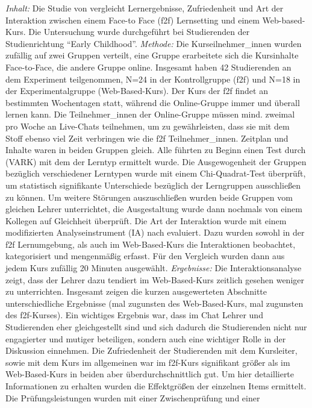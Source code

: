 \emph{Inhalt:} Die Studie von \textcite{mentzer2007two} vergleicht
Lernergebnisse, Zufriedenheit und Art der Interaktion zwischen einem
Face-to Face (f2f) Lernsetting und einem Web-based-Kurs. Die
Untersuchung wurde durchgeführt bei Studierenden der Studienrichtung
``Early Childhood''. \emph{Methode:} Die Kurseilnehmer\_innen wurden
zufällig auf zwei Gruppen verteilt, eine Gruppe erarbeitete sich die
Kursinhalte Face-to-Face, die andere Gruppe online. Insgesamt haben 42
Studierenden an dem Experiment teilgenommen, N=24 in der Kontrollgruppe
(f2f) und N=18 in der Experimentalgruppe (Web-Based-Kurs). Der Kurs der
f2f findet an bestimmten Wochentagen statt, während die Online-Gruppe
immer und überall lernen kann. Die Teilnehmer\_innen der Online-Gruppe
müssen mind. zweimal pro Woche an Live-Chats teilnehmen, um zu
gewährleisten, dass sie mit dem Stoff ebenso viel Zeit verbringen wie
die f2f Teilnehmer\_innen. Zeitplan und Inhalte waren in beiden Gruppen
gleich. Alle führten zu Beginn einen Test durch (VARK) mit dem der
Lerntyp ermittelt wurde. Die Ausgewogenheit der Gruppen bezüglich
verschiedener Lerntypen wurde mit einem Chi-Quadrat-Test überprüft, um
statistisch signifikante Unterschiede bezüglich der Lerngruppen
ausschließen zu können. Um weitere Störungen auszuschließen wurden beide
Gruppen vom gleichen Lehrer unterrichtet, die Ausgestaltung wurde dann
nochmals von einem Kollegen auf Gleichheit überprüft. Die Art der
Interaktion wurde mit einem modifizierten Analyseinstrument (IA) nach
\textcite{Flanders1961} evaluiert. Dazu wurden sowohl in der f2f
Lernumgebung, als auch im Web-Based-Kurs die Interaktionen beobachtet,
kategorisiert und mengenmäßig erfasst. Für den Vergleich wurden dann aus
jedem Kurs zufällig 20 Minuten ausgewählt. \emph{Ergebnisse:} Die
Interaktionsanalyse zeigt, dass der Lehrer dazu tendiert im
Web-Based-Kurs zeitlich gesehen weniger zu unterrichten. Insgesamt
zeigen die kurzen ausgewerteten Abschnitte unterschiedliche Ergebnisse
(mal zugunsten des Web-Based-Kurs, mal zugunsten des f2f-Kurses). Ein
wichtiges Ergebnis war, dass im Chat Lehrer und Studierenden eher
gleichgestellt sind und sich dadurch die Studierenden nicht nur
engagierter und mutiger beteiligen, sondern auch eine wichtiger Rolle in
der Diskussion einnehmen. Die Zufriedenheit der Studierenden mit dem
Kursleiter, sowie mit dem Kurs im allgemeinen war im f2f-Kurs
signifikant größer als im Web-Based-Kurs in beiden aber
überdurchschnittlich gut. Um hier detaillierte Informationen zu erhalten
wurden die Effektgrößen der einzelnen Items ermittelt. Die
Prüfungsleistungen wurden mit einer Zwischenprüfung und einer
